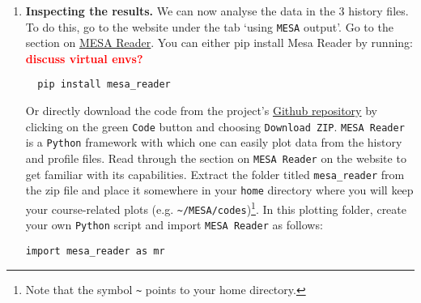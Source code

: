 \documentclass[11pt,a4paper]{article}
\newcommand{\todo}[1]{\textbf{\textcolor{red}{#1}}}
\begin{document}
\begin{enumerate}
\begin{enumerate}
    \item After the model finishes, create a new copy of the work folder and rename the \textbf{old} folder to an appropriate name (e.g. identify it by the mass and overshoot value used, like \verb|M3_0ov0| for mass 3 and overshoot 0). 
    In the new work folder, uncomment the lines relating to convective overshooting in your inlist and change the overshooting parameter \verb|overshoot_f(1)| to 0.25. 
    Look for the meaning of this and other overshooting parameters in the file \verb|$MESA_DIR/star/defaults/controls.defaults| or by checking \href{https://docs.mesastar.org/en/latest/reference/controls.html}{the documentation online}.
    \footnote{Note that the documentation online is for the latest version of \texttt{MESA}, which may differ slightly from the version you are using. The bottom right of the documentation page shows which version of the docs you are viewing, but note this only dates back to version r15140, which is when MESA was migrated to GitHub.
    \texttt{\$MESA\_DIR/star/defaults/controls.defaults} will always show the information for the correct version for your installation.}
    Then compile and run the code again.  Repeat this process for an overshooting parameter of 0.5.

\end{enumerate}



\item \textbf{Inspecting the results. }
We can now analyse the data in the 3 history files. To do this, go to the website under the tab `using \texttt{MESA} output'. Go to the section on \href{https://docs.mesastar.org/en/latest/using_mesa/output.html#plotting-mesa-output}{MESA Reader}. 
%
You can either pip install Mesa Reader by running: \todo{discuss virtual envs?}
  \begin{lstlisting}
  pip install mesa_reader
  \end{lstlisting}
Or directly download the code from the project's \href{https://github.com/wmwolf/py_mesa_reader}{Github repository} by clicking on the green \texttt{Code} button and choosing \texttt{Download ZIP}. 
%
\texttt{MESA Reader} is a \texttt{Python} framework with which one can easily plot data from the history and profile files. Read through the section on \texttt{MESA Reader} on the website to get familiar with its capabilities. 
Extract the folder titled \texttt{mesa\_reader} from the zip file and place it somewhere in your \texttt{home} directory where you will keep your course-related plots (e.g. \verb|~/MESA/codes|)\footnote{Note that the symbol \texttt{\~} points to your home directory.}. 
In this plotting folder, create your own \texttt{Python} script and import \texttt{MESA Reader} as follows:
\begin{lstlisting}[style=pythonstyle]
 import mesa_reader as mr
\end{lstlisting}


\end{enumerate}
\end{document}
